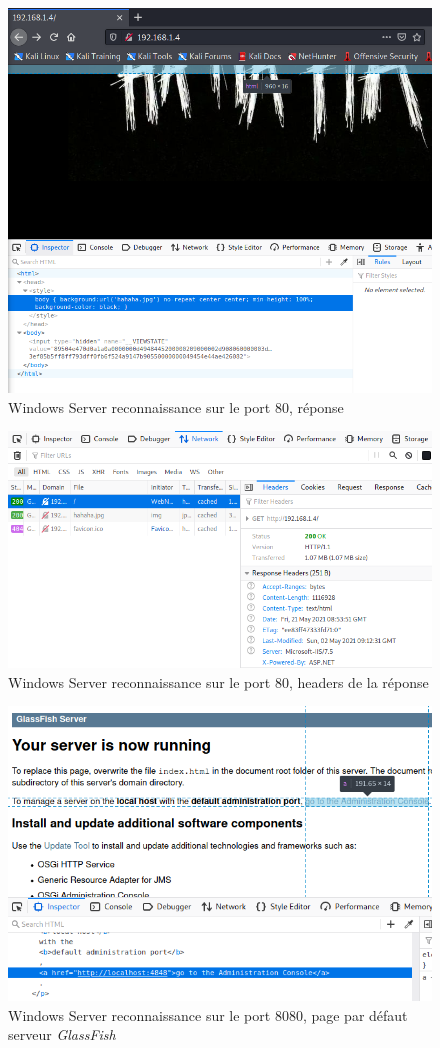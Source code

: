 \documentclass[a4paper]{article}
\begin{document}
\begin{figure}[H]
    \centering
    \includegraphics[width=0.70\linewidth]{images/reconnaissance-01.PNG}
    \caption{Windows Server reconnaissance sur le port 80, réponse}
    \label{fig:reconnaissance01}
\end{figure}
\begin{figure}[H]
    \centering
    \includegraphics[width=0.85\linewidth]{images/reconnaissance-02.PNG}
    \caption{Windows Server reconnaissance sur le port 80, headers de la réponse}
    \label{fig:reconnaissance02}
\end{figure}
\begin{figure}[H]
    \centering
    \includegraphics[width=0.85\linewidth]{images/reconnaissance-07.PNG}
    \caption{Windows Server reconnaissance sur le port 8080, page par défaut serveur \textit{GlassFish}}
    \label{fig:reconnaissance07}
\end{figure}
\end{document}
